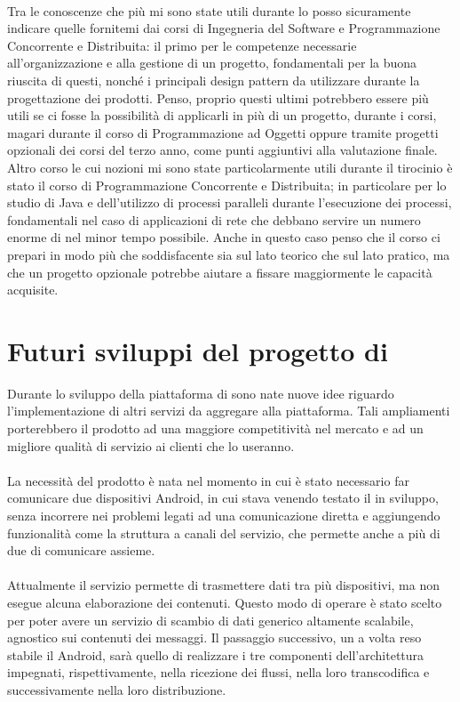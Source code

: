 \paragraph*{}
Tra le conoscenze che più mi sono state utili durante lo  posso sicuramente indicare quelle fornitemi dai corsi di Ingegneria del Software e Programmazione Concorrente e Distribuita: il primo per le competenze necessarie all'organizzazione e alla gestione di un progetto, fondamentali per la buona riuscita di questi, nonché i principali design pattern da utilizzare durante la progettazione dei prodotti. Penso, proprio questi ultimi potrebbero essere più utili se ci fosse la possibilità di applicarli in più di un progetto, durante i corsi, magari durante il corso di Programmazione ad Oggetti oppure tramite progetti opzionali dei corsi del terzo anno, come punti aggiuntivi alla valutazione finale. Altro corso le cui nozioni mi sono state particolarmente utili durante il tirocinio è stato il corso di Programmazione Concorrente e Distribuita; in particolare per lo studio di Java e dell'utilizzo di processi paralleli durante l'esecuzione dei processi, fondamentali nel caso di applicazioni di rete che debbano servire un numero enorme di  nel minor tempo possibile. Anche in questo caso penso che il corso ci prepari in modo più che soddisfacente sia sul lato teorico che sul lato pratico, ma che un progetto opzionale potrebbe aiutare a fissare maggiormente le capacità acquisite.

\section{Futuri sviluppi del progetto di }
Durante lo sviluppo della piattaforma di  sono nate nuove idee riguardo l'implementazione di altri servizi da aggregare alla piattaforma. Tali ampliamenti porterebbero il prodotto ad una maggiore competitività nel mercato e ad un migliore qualità di servizio ai clienti che lo useranno.
\paragraph*{}
La necessità del prodotto è nata nel momento in cui è stato necessario far comunicare due dispositivi Android, in cui stava venendo testato il  in sviluppo, senza incorrere nei problemi legati ad una comunicazione diretta e aggiungendo funzionalità come la struttura a canali del servizio, che permette anche a più di due  di comunicare assieme.
\paragraph*{}
Attualmente il servizio permette di trasmettere dati tra più dispositivi, ma non esegue alcuna elaborazione dei contenuti. Questo modo di operare è stato scelto per poter avere un servizio di scambio di dati generico altamente scalabile, agnostico sui contenuti dei messaggi. Il passaggio successivo, un a volta reso stabile il  Android, sarà quello di realizzare i tre componenti dell'architettura impegnati, rispettivamente, nella ricezione dei flussi, nella loro transcodifica e successivamente nella loro distribuzione.
